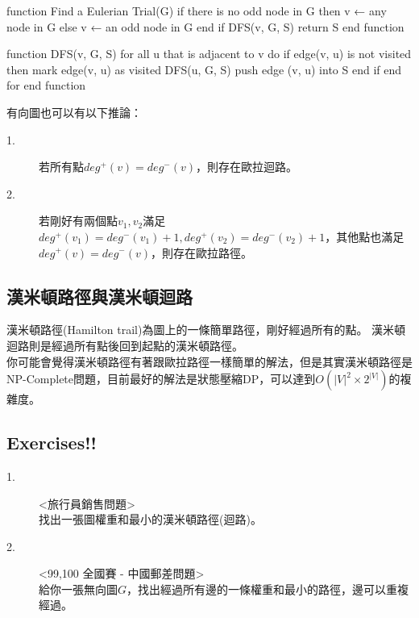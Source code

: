 \documentclass{article}
\begin{document}
\begin{algorithm}[caption={Euler Trial}, label={alg1}]
function Find a Eulerian Trial(G)
    if there is no odd node in G then
        v ← any node in G
    else
        v ← an odd node in G
    end if
    DFS(v, G, S)
    return S
end function

function DFS(v, G, S)
    for all u that is adjacent to v do
        if edge(v, u) is not visited then
            mark edge(v, u) as visited
            DFS(u, G, S)
            push edge (v, u) into S
        end if
    end for
end function
\end{algorithm}

有向圖也可以有以下推論：
\begin{description}
\item[ 1.]若所有點$deg^+(v) = deg^-(v)$，則存在歐拉迴路。
\item[ 2.]若剛好有兩個點$v_1,v_2$滿足$deg^+(v_1) = deg^-(v_1) + 1, deg^+(v_2) = deg^-(v_2) + 1$，其他點也滿足$deg^+(v) = deg^-(v)$，則存在歐拉路徑。
\end{description}

\subsection{漢米頓路徑與漢米頓迴路}
漢米頓路徑(Hamilton trail)為圖上的一條簡單路徑，剛好經過所有的點。
漢米頓迴路則是經過所有點後回到起點的漢米頓路徑。\\[2em]
你可能會覺得漢米頓路徑有著跟歐拉路徑一樣簡單的解法，但是其實漢米頓路徑是NP-Complete問題，目前最好的解法是狀態壓縮DP，可以達到$O(|V|^2 \times 2^{|V|})$的複雜度。

\subsection{Exercises!!}
\begin{description}
\item[ 1.]<旅行員銷售問題>\\
找出一張圖權重和最小的漢米頓路徑(迴路)。
\item[ 2.]<99,100 全國賽 - 中國郵差問題>\\
給你一張無向圖$G$，找出經過所有邊的一條權重和最小的路徑，邊可以重複經過。
\end{description}
\end{document}
